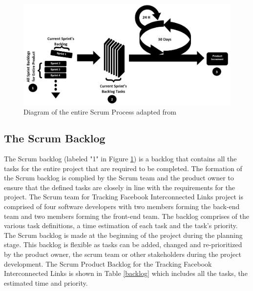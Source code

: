 \documentclass[12pt,onecolumn]{article}
\begin{document}
	\begin{figure}[h!]
		\centering
		\includegraphics[width=\textwidth]{scrum}
		\caption{Diagram of the entire Scrum Process adapted from \cite{Haunts}}
		\label{scrum}
	\end{figure}
	
	\subsection{The Scrum Backlog } \label{scrumback}
	The Scrum backlog (labeled "1" in Figure \ref{scrum}) is a backlog that contains all the tasks for the entire project that are required to be completed. The formation of the Scrum backlog is complied by the Scrum team and the product owner to ensure that the defined tasks are closely in line with the requirements for the project. The Scrum team for Tracking Facebook Interconnected Links project is comprised of four software developers with two members forming the back-end team and two members forming the front-end team. The backlog comprises of the various task definitions, a time estimation of each task and the task's priority. The Scrum backlog is made at the beginning of the project during the planning stage. This backlog is flexible as tasks can be added, changed and re-prioritized by the product owner, the scrum team or other stakeholders during the project development. The Scrum Product Backlog for the Tracking Facebook Interconnected Links is shown in Table \ref{backlog} which includes all the tasks, the estimated time and priority.     
	
\end{document}
